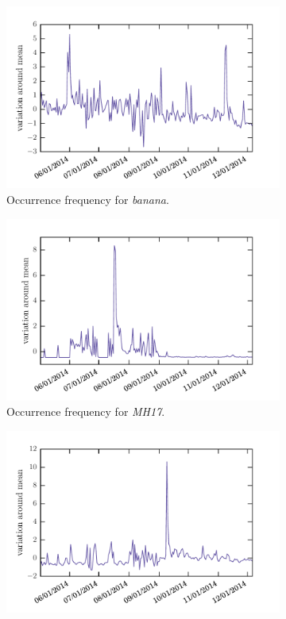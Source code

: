 \documentclass[12pt, a4paper]{article}
\begin{document}
\begin{figure}
\centering
\begin{subfigure}{.5\textwidth}
  \centering
  \includegraphics[width=.9\linewidth]{figs/banana.pdf}
  \caption{Occurrence frequency for \textit{banana}.}
  \label{fig:sub21}
\end{subfigure}%
\begin{subfigure}{.5\textwidth}
  \centering
  \includegraphics[width=.9\linewidth]{figs/mh17.pdf}
  \caption{Occurrence frequency for \textit{MH17}.}
  \label{fig:sub22}
\end{subfigure}
\begin{subfigure}{.5\textwidth}
  \centering
  \includegraphics[width=.9\linewidth]{figs/apple.pdf}

\end{subfigure}
\end{figure}
\end{document}
